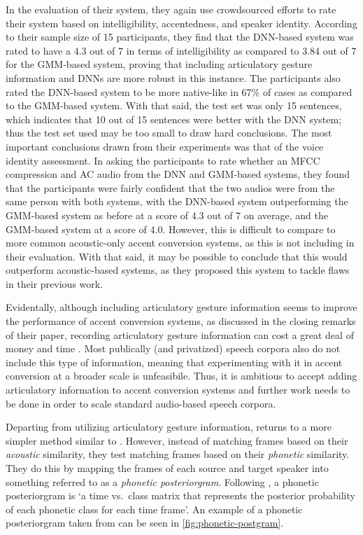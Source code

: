 \documentclass
[
    a4paper,
    twoside,
    12pt,
]
{report}
\begin{document}
In the evaluation of their system, they again use crowdsourced efforts
to rate their system based on intelligibility, accentedness, and speaker
identity. According to their sample size of 15 participants, they find
that the DNN-based system was rated to have a 4.3 out of 7 in terms of
intelligibility as compared to 3.84 out of 7 for the GMM-based system,
proving that including articulatory gesture information and DNNs are
more robust in this instance. The participants also rated the DNN-based
system to be more native-like in 67\% of cases as compared to the
GMM-based system. With that said, the test set was only 15 sentences,
which indicates that 10 out of 15 sentences were better with the DNN
system; thus the test set used may be too small to draw hard
conclusions. The most important conclusions drawn from their experiments
was that of the voice identity assessment. In asking the participants to
rate whether an MFCC compression and AC audio from the DNN and GMM-based
systems, they found that the participants were fairly confident that the
two audios were from the same person with both systems, with the
DNN-based system outperforming the GMM-based system as before at a score
of 4.3 out of 7 on average, and the GMM-based system at a score of 4.0.
However, this is difficult to compare to more common acoustic-only
accent conversion systems, as this is not including in their evaluation.
With that said, it may be possible to conclude that this would
outperform acoustic-based systems, as they proposed this system to
tackle flaws in their previous work.

Evidentally, although including articulatory gesture information seems
to improve the performance of accent conversion systems, as discussed in
the closing remarks of their paper, recording articulatory gesture
information can cost a great deal of money and time
\parencite{aryal2015}. Most publically (and privatized) speech corpora
also do not include this type of information, meaning that experimenting
with it in accent conversion at a broader scale is unfeasibile. Thus, it
is ambitious to accept adding articulatory information to accent
conversion systems and further work needs to be done in order to scale
standard audio-based speech corpora.

Departing from utilizing articulatory gesture information,
\textcite{zhao2018a} returns to a more simpler method similar to
\textcite{aryal2014}. However, instead of matching frames based on their
\emph{acoustic} similarity, they test matching frames based on their
\emph{phonetic} similarity. They do this by mapping the frames of each
source and target speaker into something referred to as a \emph{phonetic
posteriorgram}. Following \textcite{hazen2009}, a phonetic posteriorgram
is `a time vs.~class matrix that represents the posterior probability of
each phonetic class for each time frame'. An example of a phonetic
posteriorgram taken from \textcite{hazen2009} can be seen in
\autoref{fig:phonetic-postgram}.
\end{document}
